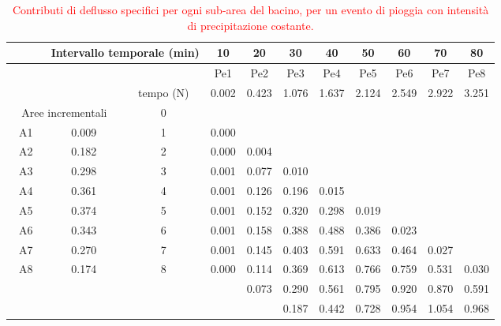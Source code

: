 \begin{table}[H] \centering
    \caption{\textcolor{red}{Contributi di deflusso specifici per ogni sub-area del bacino, per un evento di pioggia con intensità di precipitazione costante.}}
    \begin{tabular}{ccccccccccc}
    \toprule
 & \multicolumn{2}{c}{Intervallo temporale (min)}  & 10& 20    & 30    & 40    & 50    & 60    & 70    & 80    \\ 
 \midrule
 & & & Pe1   & Pe2   & Pe3   & Pe4   & Pe5   & Pe6   & Pe7   & Pe8   \\
&& tempo (N)& 0.002 & 0.423 & 1.076 & 1.637 & 2.124 & 2.549 & 2.922 & 3.251 \\
    \multicolumn{2}{c}{Aree incrementali} & 0                     &       &       &       &       &       &       &       &       \\
    A1          & 0.009                   & 1                     & 0.000 &       &       &       &       &       &       &       \\
    A2          & 0.182                   & 2                     & 0.000 & 0.004 &       &       &       &       &       &       \\
    A3          & 0.298                   & 3                     & 0.001 & 0.077 & 0.010 &       &       &       &       &       \\
    A4          & 0.361                   & 4                     & 0.001 & 0.126 & 0.196 & 0.015 &       &       &       &       \\
    A5          & 0.374                   & 5                     & 0.001 & 0.152 & 0.320 & 0.298 & 0.019 &       &       &       \\
    A6          & 0.343                   & 6                     & 0.001 & 0.158 & 0.388 & 0.488 & 0.386 & 0.023 &       &       \\
    A7          & 0.270                   & 7                     & 0.001 & 0.145 & 0.403 & 0.591 & 0.633 & 0.464 & 0.027 &       \\
    A8          & 0.174                   & 8                     & 0.000 & 0.114 & 0.369 & 0.613 & 0.766 & 0.759 & 0.531 & 0.030 \\
    \textbf{}   &                         &                       &       & 0.073 & 0.290 & 0.561 & 0.795 & 0.920 & 0.870 & 0.591 \\
    \textbf{}   &                         &                       &       &       & 0.187 & 0.442 & 0.728 & 0.954 & 1.054 & 0.968 \\

\end{tabular}
\end{table}
